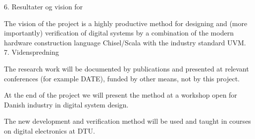 \documentclass[fleqn,12pt]{article}
\begin{document}
6. Resultater og vision for 

The vision of the project is a highly productive method for designing and (more importantly) verification of digital systems by a combination of the modern hardware construction language Chisel/Scala with the industry standard UVM.
7. Videnspredning

The research work will be documented by publications and presented at relevant conferences (for example DATE), funded by other means, not by this project.

At the end of the project we will present the method at a workshop open for Danish industry in digital system design.

The new development and verification method will be used and taught in courses on digital electronics at DTU.
\end{document}
